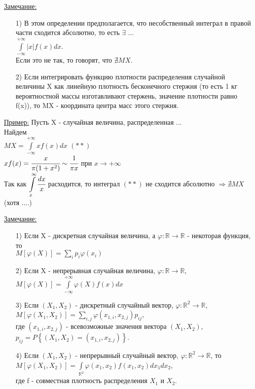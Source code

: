 \underline{Замечание:} 
\begin{enumerate}
	\item[1)] В этом определении предполагается, что несобственный интеграл в правой части сходится абсолютно, то есть $\exists$ ... \\
	$\displaystyle  \int\limits_{-\infty}^{+\infty} |x| f(x) dx$. \\
	Если это не так, то говорят, что $\nexists MX$.
	
	\item[2)] Если интегрировать функцию плотности распределения случайной величины X как линейную плотность бесконечного стержня (то есть 1 кг вероятностной массы изготавливают стержень, значение плотности равно f(x)), то MX - координата центра масс этого стержня.
\end{enumerate}


\underline{Пример:} Пусть X - случайная величина, распределенная ... \\
Найдем \\
$\displaystyle  MX = \int\limits_{-\infty}^{+\infty} x f(x) dx$ $(**)$ \\
$x f(x) = \cfrac{x}{\pi (1 + x^2)} \sim \cfrac{1}{\pi x}$ при $x \to +\infty$\\
Так как $\displaystyle \int\limits_x^\infty \cfrac{dx}{x}$ расходится, то интеграл $(**)$ не сходится абсолютно $\Rightarrow \nexists MX$  (хотя ....)


\underline{Замечание:}
\begin{enumerate}
	\item[1)] Если X - дискретная случайная величина, а $\varphi: \mathbb{R} \to \mathbb{R}$ - некоторая функция, то \\
	$M\left[\varphi(X)\right] = \sum\limits_i p_i \varphi(x_i)$ 
	
	\item[2)] Если X - непрерывная случайная величина, $\varphi: \mathbb{R} \to \mathbb{R}$, \\
	$\displaystyle  M\left[\varphi(X)\right] = \int\limits_{-\infty}^{+\infty} \varphi(X) f(x) dx$ \\
	
	\item[3)] Если $(X_1, X_2)$ - дискретный случайный вектор, $\varphi: \mathbb{R}^2 \to \mathbb{R}$, \\
	$M\left[\varphi(X_1, X_2)\right] = \sum\limits_{i,j} \varphi(x_{1,i}, x_{2,j}) p_{ij}$, \\
	где $(x_{1,i}, x_{2,j})$ - всевозможные значения вектора $(X_1, X_2)$, $p_{ij} = P\left\{(X_1, X_2) = (x_{1,i}, x_{2,j})\right\}$.
	
	\item[4)] Если $(X_1, X_2)$ - непрерывный случайный вектор, $\varphi: \mathbb{R}^2 \to \mathbb{R}$, то \\
	$\displaystyle  M\left[\varphi(X_1, X_2)\right] = \int\limits_{\mathbb{R}^2} \varphi(x_1, x_2) f(x_1, x_2) dx_1 dx_2$, \\
	где f - совместная плотность распределения $X_1$ и $X_2$.
\end{enumerate}


